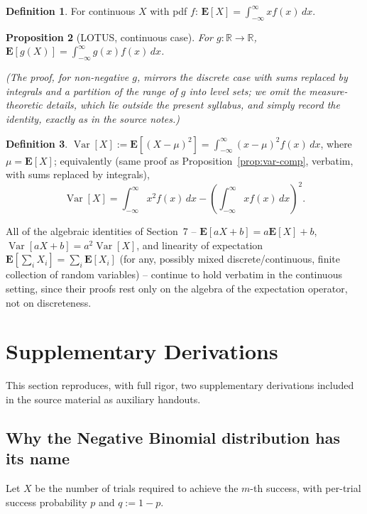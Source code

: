 \documentclass[11pt]{article}
\theoremstyle{definition}
\newtheorem{definition}{Definition}[section]
\theoremstyle{plain}
\newtheorem{proposition}[definition]{Proposition}
\theoremstyle{remark}
\newcommand{\E}[1]{\mathbf{E}\!\left[#1\right]}
\newcommand{\Var}[1]{\operatorname{Var}\!\left[#1\right]}
\newcommand{\R}{\mathbb{R}}
\begin{document}
\begin{definition}
For continuous $X$ with pdf $f$: $\displaystyle \E{X} = \int_{-\infty}^\infty x f(x)\,dx$.
\end{definition}

\begin{proposition}[LOTUS, continuous case]
For $g:\R\to\R$, $\displaystyle \E{g(X)} = \int_{-\infty}^\infty g(x)f(x)\,dx$.
\end{proposition}
\emph{(The proof, for non-negative $g$, mirrors the discrete case with sums replaced by integrals
and a partition of the range of $g$ into level sets; we omit the measure-theoretic details, which
lie outside the present syllabus, and simply record the identity, exactly as in the source notes.)}

\begin{definition}
$\Var{X} := \E{(X-\mu)^2} = \displaystyle\int_{-\infty}^\infty (x-\mu)^2 f(x)\,dx$, where
$\mu=\E{X}$; equivalently (same proof as Proposition~\ref{prop:var-comp}, verbatim, with sums
replaced by integrals),
\[
\Var{X} = \int_{-\infty}^\infty x^2 f(x)\,dx - \left(\int_{-\infty}^\infty x f(x)\,dx\right)^{\!2}.
\]
\end{definition}

All of the algebraic identities of Section~7 -- $\E{aX+b}=a\E{X}+b$, $\Var{aX+b}=a^2\Var{X}$, and
linearity of expectation $\E{\sum_i X_i}=\sum_i \E{X_i}$ (for any, possibly mixed
discrete/continuous, finite collection of random variables) -- continue to hold verbatim in the
continuous setting, since their proofs rest only on the algebra of the expectation operator, not
on discreteness.

\newpage
\section{Supplementary Derivations}

This section reproduces, with full rigor, two supplementary derivations included in the source
material as auxiliary handouts.

\subsection{Why the Negative Binomial distribution has its name}

Let $X$ be the number of trials required to achieve the $m$-th success, with per-trial success
probability $p$ and $q:=1-p$.
\end{document}

